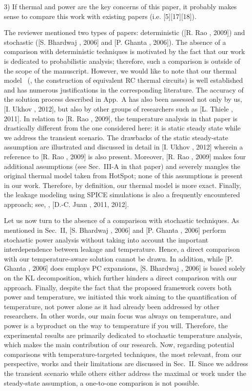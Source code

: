 \begin{reviewer}
3) If thermal and power are the key concerns of this paper, it probably makes sense to compare this work with existing papers (i.e. [5][17][18]).
\end{reviewer}
\begin{authors}
The reviewer mentioned two types of papers: deterministic ([R. Rao \etal, 2009]) and stochastic ([S. Bhardwaj \etal, 2006] and [P. Ghanta \etal, 2006]).
The absence of a comparison with deterministic techniques is motivated by the fact that our work is dedicated to probabilistic analysis; therefore, such a comparison is outside of the scope of the manuscript.
However, we would like to note that our thermal model \perse\ (\ie, the construction of equivalent RC thermal circuits) is well established and has numerous justifications in the corresponding literature.
The accuracy of the solution process described in App.~A has also been assessed not only by us, [I. Ukhov \etal, 2012], but also by other groups of researchers such as [L. Thiele \etal, 2011].
In relation to [R. Rao \etal, 2009], the temperature analysis in that paper is drastically different from the one considered here: it is static steady state while we address the transient scenario.
The drawbacks of the static steady-state assumption are illustrated and discussed in detail in [I. Ukhov \etal, 2012] wherein a reference to [R. Rao \etal, 2009] is also present.
Moreover, [R. Rao \etal, 2009] makes four additional assumptions (see Sec.~III-A in that paper) and severely mangles the original thermal model taken from HotSpot; none of this assumptions is present in our work.
Therefore, by definition, our thermal model is more exact.
Finally, the leakage modeling using SPICE simulations is also a frequently encountered approach; see, \eg, [D.-C. Juan \etal, 2011, 2012].

Let us now turn to the absence of a comparison with stochastic techniques.
As mentioned in Sec.~II, [S. Bhardwaj \etal, 2006] and [P. Ghanta \etal, 2006] perform stochastic power analysis without taking into account the important interdependence between leakage and temperature.
Hence, a direct comparison with our temperature-aware solution cannot be drawn.
In addition, while [P. Ghanta \etal, 2006] does employs PC expansions, [S. Bhardwaj \etal, 2006] is based solely on the KL decomposition, which further hinders a direct comparison with our approach.
Finally, despite the fact that the proposed framework covers both power and temperature, we initiated this work aiming to the quantification of temperature, not power alone as it had already been addressed by other researchers.
In other words, our main focus was always on temperature, and power is a byproduct on the way to temperature if you will.
Therefore, the experimental results are primarily dedicated to stochastic temperature analysis, which makes the main contribution of our research.
Now, regarding potential comparisons with temperature-targeted techniques, the most relevant, from our perspective, works and their limitations are discussed in Sec.~II.
Since we address the transient scenario while others either address the maximal or work under the steady-state assumption, a one-to-one comparison is not possible.

\end{authors}
